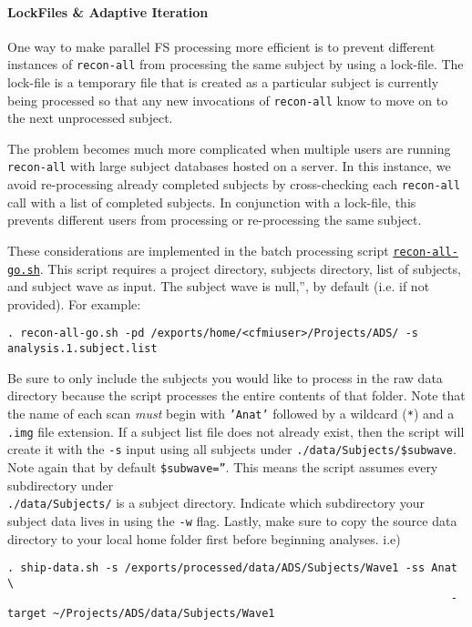 \documentclass[paper=a4, fontsize=11pt]{scrartcl} %
\numberwithin{equation}{section} %
\numberwithin{figure}{section} %
\numberwithin{table}{section} %
\begin{document}
\paragraph{LockFiles \& Adaptive Iteration} One way to make parallel FS processing more efficient is to prevent different instances of \texttt{recon-all} from processing the same subject by using a lock-file.  The lock-file is a temporary file that is created as a particular subject is currently being processed so that any new invocations of \texttt{recon-all} know to move on to the next unprocessed subject.  

The problem becomes much more complicated when multiple users are running \texttt{recon-all} with large subject databases hosted on a server.  In this instance, we avoid re-processing already completed subjects  by cross-checking each \texttt{recon-all} call with a list of completed subjects. In conjunction with a lock-file, this prevents different users from processing or re-processing the same subject.

These considerations are implemented in the batch processing script \href{https://www.dropbox.com/s/j7zmp29bkdeg9h5/recon-all-go.sh?dl=0}{\texttt{recon-all-go.sh}}.  This script requires a project directory, subjects directory, list of subjects, and subject wave as input.  The subject wave is null,'', by default (i.e. if not provided). For example:

\begin{lstlisting}
. recon-all-go.sh -pd /exports/home/<cfmiuser>/Projects/ADS/ -s analysis.1.subject.list
\end{lstlisting}

Be sure to only include the subjects you would like to process in the raw data directory because the script processes the entire contents of that folder. Note that the name of each scan \textit{must} begin with \texttt{'Anat'} followed by a wildcard (\texttt{*}) and a \texttt{.img} file extension. If a subject list file does not already exist, then the script will create it with the \texttt{-s} input using all subjects under \texttt{./data/Subjects/\$subwave}. Note again that by default \texttt{\$subwave=''}. This means the script assumes every subdirectory under 
\\ \texttt{./data/Subjects/} is a subject directory.  Indicate which subdirectory your subject data lives in using the \texttt{-w} flag. Lastly, make sure to copy the source data directory to your local home folder first before beginning analyses.  i.e)
\begin{lstlisting}
. ship-data.sh -s /exports/processed/data/ADS/Subjects/Wave1 -ss Anat \
																	-target ~/Projects/ADS/data/Subjects/Wave1
\end{lstlisting}
\end{document}
